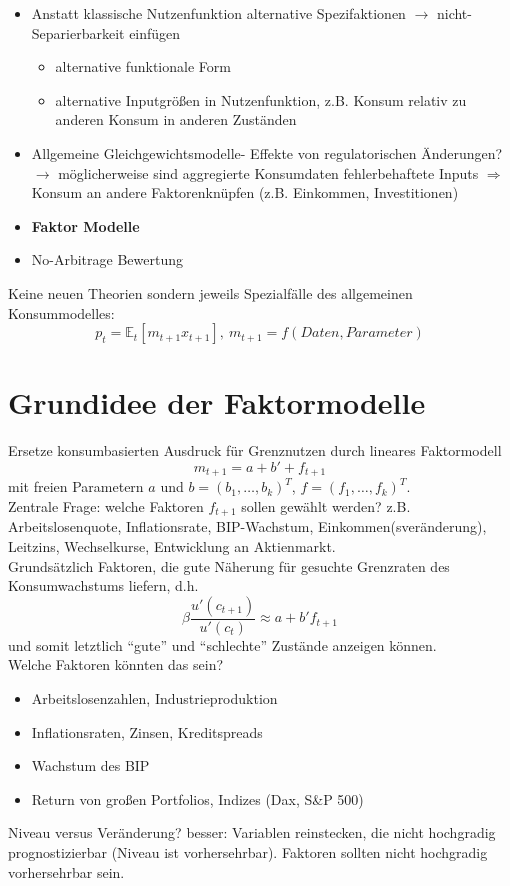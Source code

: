 \documentclass[12pt]{extreport} %
\theoremstyle{named}
\theoremstyle{nnamed}
\theoremstyle{itshape}
\theoremstyle{normal}
\begin{document}
\begin{itemize}
	\item Anstatt klassische Nutzenfunktion alternative Spezifaktionen $\rightarrow$ nicht-Separierbarkeit einfügen
		\begin{itemize}
			\item alternative funktionale Form
			\item alternative Inputgrößen in Nutzenfunktion, z.B. Konsum relativ zu anderen Konsum in anderen Zuständen
		\end{itemize}
	\item Allgemeine Gleichgewichtsmodelle- Effekte von regulatorischen Änderungen? $\rightarrow$ möglicherweise sind aggregierte Konsumdaten fehlerbehaftete Inputs $\Rightarrow$ Konsum an andere Faktorenknüpfen (z.B. Einkommen, Investitionen)
	\item \textbf{Faktor Modelle}
	\item No-Arbitrage Bewertung
\end{itemize}

Keine neuen Theorien sondern jeweils Spezialfälle des allgemeinen Konsummodelles:
	$$ p_t = \mathbb{E}_t \left[ m_{t+1} x_{t+1} \right], ~m_{t+1} = f(Daten, Parameter) $$

\section{Grundidee der Faktormodelle}

Ersetze konsumbasierten Ausdruck für Grenznutzen durch lineares Faktormodell
	$$ m_{t+1} = a + b' + f_{t+1} $$
	mit freien Parametern $a$ und $b = (b_1, \dotsc, b_k)^T$, $f = (f_1, \dotsc, f_k)^T$. ~\\
	
Zentrale Frage: welche Faktoren $f_{t+1}$ sollen gewählt werden? z.B. Arbeitslosenquote, Inflationsrate, BIP-Wachstum, Einkommen(sveränderung), Leitzins, Wechselkurse, Entwicklung an Aktienmarkt. ~\\

Grundsätzlich Faktoren, die gute Näherung für gesuchte Grenzraten des Konsumwachstums liefern, d.h.
	$$ \beta \frac{u'(c_{t+1})}{u'(c_t)} \approx a + b' f_{t+1} $$
und somit letztlich \enquote{gute} und \enquote{schlechte} Zustände anzeigen können. ~\\

Welche Faktoren könnten das sein?
\begin{itemize}
	\item Arbeitslosenzahlen, Industrieproduktion
	\item Inflationsraten, Zinsen, Kreditspreads
	\item Wachstum des BIP
	\item Return von großen Portfolios, Indizes (Dax, S\&P 500)
\end{itemize}
Niveau versus Veränderung? besser: Variablen reinstecken, die nicht hochgradig prognostizierbar (Niveau ist vorhersehrbar). Faktoren sollten nicht hochgradig vorhersehrbar sein. ~\\
\end{document}
